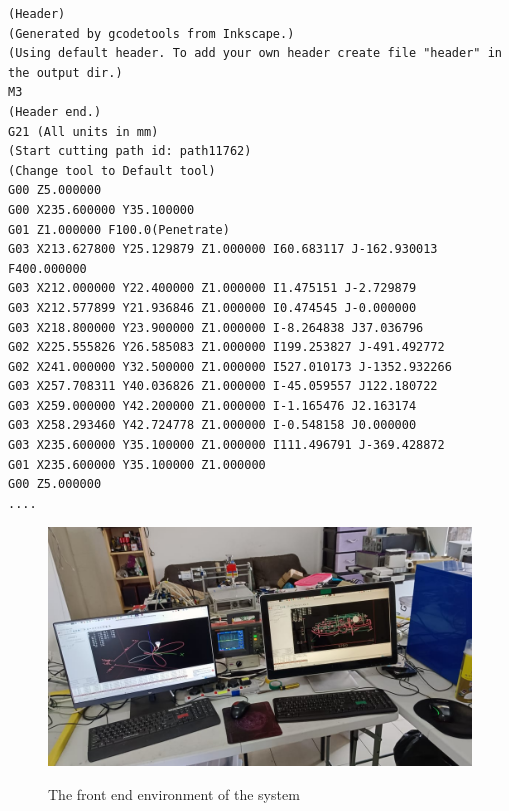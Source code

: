 \clearpage
\pagebreak
\begin{landscape}
	
	
\begin{lstlisting}[caption={G-code snippet for Arabic calligraphy}, label=Link-to-Arabic-Calligraphy]	
(Header)
(Generated by gcodetools from Inkscape.) 
(Using default header. To add your own header create file "header" in the output dir.)
M3
(Header end.)
G21 (All units in mm)
(Start cutting path id: path11762)
(Change tool to Default tool)
G00 Z5.000000
G00 X235.600000 Y35.100000
G01 Z1.000000 F100.0(Penetrate)
G03 X213.627800 Y25.129879 Z1.000000 I60.683117 J-162.930013 F400.000000
G03 X212.000000 Y22.400000 Z1.000000 I1.475151 J-2.729879
G03 X212.577899 Y21.936846 Z1.000000 I0.474545 J-0.000000
G03 X218.800000 Y23.900000 Z1.000000 I-8.264838 J37.036796
G02 X225.555826 Y26.585083 Z1.000000 I199.253827 J-491.492772
G02 X241.000000 Y32.500000 Z1.000000 I527.010173 J-1352.932266
G03 X257.708311 Y40.036826 Z1.000000 I-45.059557 J122.180722
G03 X259.000000 Y42.200000 Z1.000000 I-1.165476 J2.163174
G03 X258.293460 Y42.724778 Z1.000000 I-0.548158 J0.000000
G03 X235.600000 Y35.100000 Z1.000000 I111.496791 J-369.428872
G01 X235.600000 Y35.100000 Z1.000000
G00 Z5.000000
....
\end{lstlisting}

\end{landscape}
	
\clearpage
\pagebreak

\begin{landscape}
\begin{figure}
\caption{The front end environment of the system}
\includegraphics[width=1.60\textwidth]{Image0/THE-FRONT-END-WhatsAppImage.jpeg} 
\label{THE-FRONT-END-WhatsAppImage.jpeg}
\end{figure}
\end{landscape}

